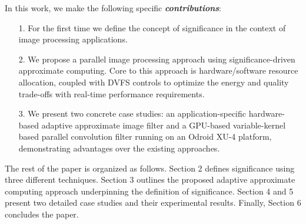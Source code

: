 \documentclass[journal]{IEEEtran}
\begin{document}
In this work, we make the following specific \textbf{\textit{contributions}}:
\begin{itemize}
\item[1.] For the first time we define the concept of significance in the context of image processing applications.
\item[2.] We propose a parallel image processing approach using significance-driven approximate computing. Core to this approach is hardware\slash software resource allocation, coupled with DVFS controls to optimize the energy and quality trade-offs with real-time performance requirements.
\item[3.] We present two concrete case studies: an application-specific hardware-based adaptive approximate image filter and a GPU-based variable-kernel based parallel convolution filter running on an Odroid XU-4 platform, demonstrating advantages over the existing approaches.
\end{itemize}

The rest of the paper is organized as follows. Section 2 defines significance using three different techniques. Section 3 outlines the proposed adaptive approximate computing approach underpinning the definition of significance. Section 4 and 5 present two detailed case studies and their experimental results. Finally, Section 6 concludes the paper.
\end{document}
